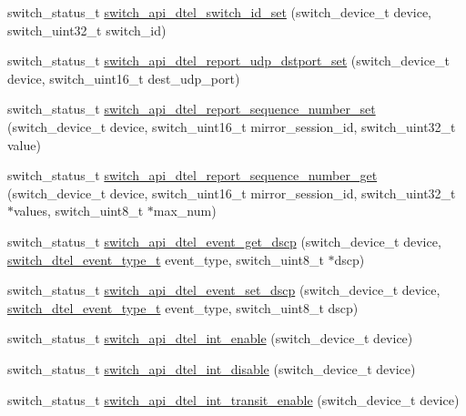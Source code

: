 \begin{DoxyCompactItemize}
\item 
switch\+\_\+status\+\_\+t \hyperlink{group__DTel_gab071727a1336771333f6f0ffdcf63058}{switch\+\_\+api\+\_\+dtel\+\_\+switch\+\_\+id\+\_\+set} (switch\+\_\+device\+\_\+t device, switch\+\_\+uint32\+\_\+t switch\+\_\+id)
\item 
switch\+\_\+status\+\_\+t \hyperlink{group__DTel_ga7eb5f6766fe9555fd9d7e42bdc98ec21}{switch\+\_\+api\+\_\+dtel\+\_\+report\+\_\+udp\+\_\+dstport\+\_\+set} (switch\+\_\+device\+\_\+t device, switch\+\_\+uint16\+\_\+t dest\+\_\+udp\+\_\+port)
\item 
switch\+\_\+status\+\_\+t \hyperlink{group__DTel_ga9b383400b30a59f4ada6d0dcb0ba9b34}{switch\+\_\+api\+\_\+dtel\+\_\+report\+\_\+sequence\+\_\+number\+\_\+set} (switch\+\_\+device\+\_\+t device, switch\+\_\+uint16\+\_\+t mirror\+\_\+session\+\_\+id, switch\+\_\+uint32\+\_\+t value)
\item 
switch\+\_\+status\+\_\+t \hyperlink{group__DTel_ga40792edbc6206de06eb8089e604224bf}{switch\+\_\+api\+\_\+dtel\+\_\+report\+\_\+sequence\+\_\+number\+\_\+get} (switch\+\_\+device\+\_\+t device, switch\+\_\+uint16\+\_\+t mirror\+\_\+session\+\_\+id, switch\+\_\+uint32\+\_\+t $\ast$values, switch\+\_\+uint8\+\_\+t $\ast$max\+\_\+num)
\item 
switch\+\_\+status\+\_\+t \hyperlink{group__DTel_gaa332281ec741e44eda445578649a36aa}{switch\+\_\+api\+\_\+dtel\+\_\+event\+\_\+get\+\_\+dscp} (switch\+\_\+device\+\_\+t device, \hyperlink{group__DTel_ga093c7c7db287f39a58d5b3ec66bf15ec}{switch\+\_\+dtel\+\_\+event\+\_\+type\+\_\+t} event\+\_\+type, switch\+\_\+uint8\+\_\+t $\ast$dscp)
\item 
switch\+\_\+status\+\_\+t \hyperlink{group__DTel_ga57417a7e8365882a587d2faf0190b473}{switch\+\_\+api\+\_\+dtel\+\_\+event\+\_\+set\+\_\+dscp} (switch\+\_\+device\+\_\+t device, \hyperlink{group__DTel_ga093c7c7db287f39a58d5b3ec66bf15ec}{switch\+\_\+dtel\+\_\+event\+\_\+type\+\_\+t} event\+\_\+type, switch\+\_\+uint8\+\_\+t dscp)
\item 
switch\+\_\+status\+\_\+t \hyperlink{group__DTel_ga7eafffa397636f0658b5f39ed734d120}{switch\+\_\+api\+\_\+dtel\+\_\+int\+\_\+enable} (switch\+\_\+device\+\_\+t device)
\item 
switch\+\_\+status\+\_\+t \hyperlink{group__DTel_ga6f402e2442f1aee6dbac4a33d04c370d}{switch\+\_\+api\+\_\+dtel\+\_\+int\+\_\+disable} (switch\+\_\+device\+\_\+t device)
\item 
switch\+\_\+status\+\_\+t \hyperlink{group__DTel_ga72d9510f25fa9cfc022a472bd276a0e8}{switch\+\_\+api\+\_\+dtel\+\_\+int\+\_\+transit\+\_\+enable} (switch\+\_\+device\+\_\+t device)

\end{DoxyCompactItemize}
